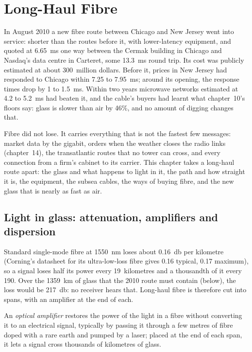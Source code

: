 \chapter{Long-Haul Fibre}\label{ch:nw:long-haul-fibre}

In August 2010 a new fibre route between Chicago and New Jersey went into service: shorter than the routes before it, with lower-latency
equipment, and quoted at \qty{6.65}{\milli\second} one way between the Cermak building in Chicago and Nasdaq's data centre in Carteret,
some \qty{13.3}{\milli\second} round trip. Its cost was publicly estimated at about 300~million dollars. Before it, prices in New Jersey had
responded to Chicago within 7.25 to \qty{7.95}{\milli\second}; around its opening, the response times drop by 1 to
\qty{1.5}{\milli\second}. Within two years microwave
networks estimated at 4.2 to \qty{5.2}{\milli\second} had beaten it, and the cable's buyers had learnt what chapter~10's floors say: glass is
slower than air by 46\%, and no amount of digging changes that.

Fibre did not lose. It carries everything that is not the fastest few messages: market data by the gigabit, orders when the weather closes
the radio links (chapter~14), the transatlantic routes that no tower can cross, and every connection from a firm's cabinet to its carrier.
This chapter takes a long-haul route apart: the glass and what happens to light in it, the path and how straight it is, the equipment, the
subsea cables, the ways of buying fibre, and the new glass that is nearly as fast as air.

\section{Light in glass: attenuation, amplifiers and dispersion}

Standard single-mode fibre at \qty{1550}{\nano\metre} loses about \qty{0.16}{\decibel} per kilometre (Corning's datasheet for its
ultra-low-loss fibre gives 0.16 typical, 0.17 maximum), so a signal loses half its power every 19~kilometres and a
thousandth of it every 190. Over the \qty{1359}{\kilo\metre} of glass that the 2010 route must contain (below), the loss would be
\qty{217}{\decibel}: no receiver hears that. Long-haul fibre is therefore cut into spans, with an amplifier at the end of each.

\begin{definition}\label{def:nw:long-haul-fibre:amp}
An \emph{optical amplifier} restores the power of the light in a fibre without converting it to an electrical
signal, typically by passing it through a few metres of fibre doped with a rare earth and pumped by a laser; placed at the end of each span,
it lets a signal cross thousands of kilometres of glass.
\end{definition}

